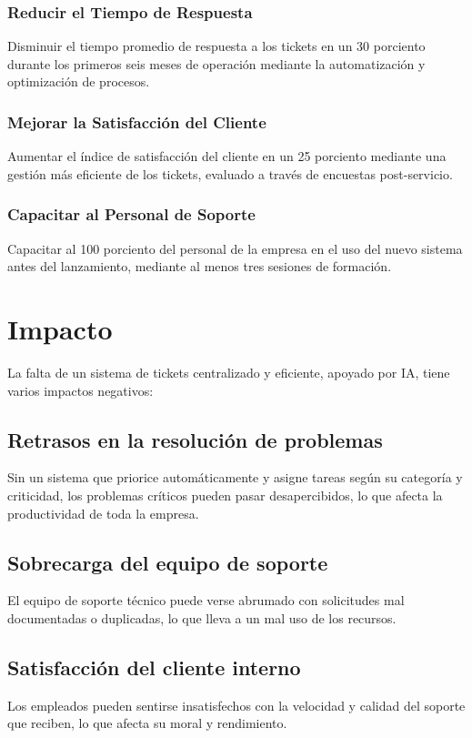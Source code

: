 \documentclass[a4paper,12pt]{article}
\begin{document}
\subsubsection{Reducir el Tiempo de Respuesta}
Disminuir el tiempo promedio de respuesta a los tickets en un 30 porciento durante los primeros seis meses de operación mediante la automatización y optimización de procesos.
\subsubsection{Mejorar la Satisfacción del Cliente}
Aumentar el índice de satisfacción del cliente en un 25 porciento mediante una gestión más eficiente de los tickets, evaluado a través de encuestas post-servicio.

\subsubsection{Capacitar al Personal de Soporte}
Capacitar al 100 porciento del personal de la empresa en el uso del nuevo sistema antes del lanzamiento, mediante al menos tres sesiones de formación.

\section{Impacto}
La falta de un sistema de tickets centralizado y eficiente, apoyado por IA, tiene varios impactos negativos:

\subsection{Retrasos en la resolución de problemas}
Sin un sistema que priorice automáticamente y asigne tareas según su categoría y criticidad, los problemas críticos pueden pasar desapercibidos, lo que afecta la productividad de toda la empresa.


\subsection{Sobrecarga del equipo de soporte}
El equipo de soporte técnico puede verse abrumado con solicitudes mal documentadas o duplicadas, lo que lleva a un mal uso de los recursos.

\subsection{Satisfacción del cliente interno}
Los empleados pueden sentirse insatisfechos con la velocidad y calidad del soporte que reciben, lo que afecta su moral y rendimiento.
\end{document}
